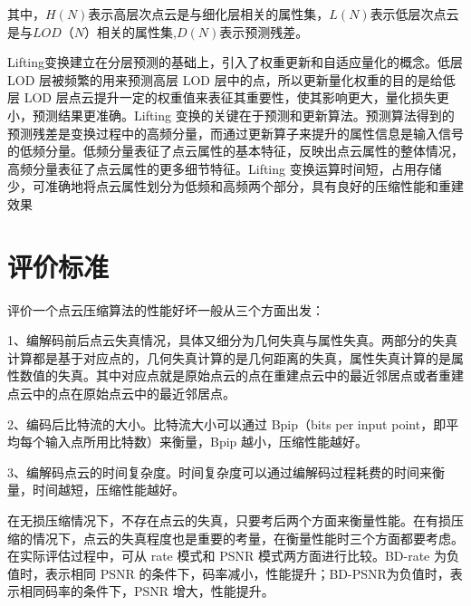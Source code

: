\documentclass[bachelor,print,msfonts]{xduthesis}
\begin{document}
其中，$H(N)$表示高层次点云是与细化层相关的属性集，$L(N)$表示低层次点云是与$LOD（N）$相关的属性集,$D(N)$表示预测残差。

Lifting变换建立在分层预测的基础上，引入了权重更新和自适应量化的概念。低层 LOD 层被频繁的用来预测高层 LOD 层中的点，所以更新量化权重的目的是给低层 LOD 层点云提升一定的权重值来表征其重要性，使其影响更大，量化损失更小，预测结果更准确。Lifting 变换的关键在于预测和更新算法。预测算法得到的预测残差是变换过程中的高频分量，而通过更新算子来提升的属性信息是输入信号的低频分量。低频分量表征了点云属性的基本特征，反映出点云属性的整体情况，高频分量表征了点云属性的更多细节特征。Lifting 变换运算时间短，占用存储少，可准确地将点云属性划分为低频和高频两个部分，具有良好的压缩性能和重建效果

\section{评价标准}
\label{sec:suborganization}
评价一个点云压缩算法的性能好坏一般从三个方面出发：

1、编解码前后点云失真情况，具体又细分为几何失真与属性失真。两部分的失真计算都是基于对应点的，几何失真计算的是几何距离的失真，属性失真计算的是属性数值的失真。其中对应点就是原始点云的点在重建点云中的最近邻居点或者重建点云中的点在原始点云中的最近邻居点。

2、编码后比特流的大小。比特流大小可以通过 Bpip（bits per input point，即平均每个输入点所用比特数）来衡量，Bpip 越小，压缩性能越好。

3、编解码点云的时间复杂度。时间复杂度可以通过编解码过程耗费的时间来衡量，时间越短，压缩性能越好。

在无损压缩情况下，不存在点云的失真，只要考后两个方面来衡量性能。在有损压缩的情况下，点云的失真程度也是重要的考量，在衡量性能时三个方面都要考虑。在实际评估过程中，可从 rate 模式和 PSNR 模式两方面进行比较。BD-rate 为负值时，表示相同 PSNR 的条件下，码率减小，性能提升；BD-PSNR为负值时，表示相同码率的条件下，PSNR 增大，性能提升。


\ifx\allfiles\undefined
\end{document}
